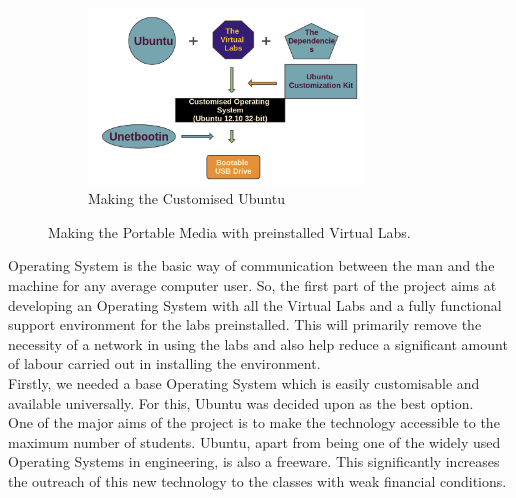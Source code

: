 \documentclass[conference]{IEEEtran}
\begin{document}
\begin{figure}
\begin{subfigure}{\columnwidth}
     \includegraphics[width=0.8\textwidth,height=1.35\textwidth]{project1}
     \caption{Making the Customised Ubuntu}
    \end{subfigure}
    \caption{Making the Portable Media with preinstalled Virtual Labs.}
\end{figure}
  Operating System is the basic way of communication between the man and the machine for any average computer user. So, the first part of the project aims at developing an Operating System with all the Virtual Labs and a fully functional support environment for the labs preinstalled. This will primarily remove the necessity of a network in using the labs and also help reduce a significant amount of labour carried out in installing the environment.\\    
  Firstly, we needed a base Operating System which is easily customisable and available universally. For this, Ubuntu was decided upon as the best option.\\ One of the major aims of the project is to make the technology accessible to the maximum number of students. Ubuntu, apart from being one of the widely used Operating Systems in engineering, is also a freeware. This significantly increases the outreach of this new technology to the classes with weak financial conditions.\\
\end{document}
